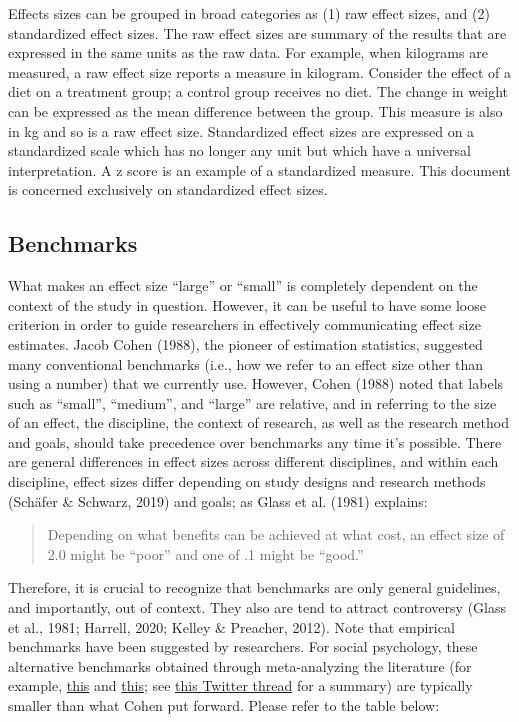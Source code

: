 \documentclass[
  man,
  colorlinks=true,linkcolor=blue,citecolor=blue,urlcolor=blue]{apa7}
\begin{document}
Effects sizes can be grouped in broad categories as (1) raw effect
sizes, and (2) standardized effect sizes. The raw effect sizes are
summary of the results that are expressed in the same units as the raw
data. For example, when kilograms are measured, a raw effect size
reports a measure in kilogram. Consider the effect of a diet on a
treatment group; a control group receives no diet. The change in weight
can be expressed as the mean difference between the group. This measure
is also in kg and so is a raw effect size. Standardized effect sizes are
expressed on a standardized scale which has no longer any unit but which
have a universal interpretation. A z score is an example of a
standardized measure. This document is concerned exclusively on
standardized effect sizes.

\hypertarget{benchmarks}{%
\subsection{Benchmarks}\label{benchmarks}}

What makes an effect size ``large'' or ``small'' is completely dependent
on the context of the study in question. However, it can be useful to
have some loose criterion in order to guide researchers in effectively
communicating effect size estimates. Jacob Cohen (1988), the pioneer of
estimation statistics, suggested many conventional benchmarks (i.e., how
we refer to an effect size other than using a number) that we currently
use. However, Cohen (1988) noted that labels such as ``small'',
``medium'', and ``large'' are relative, and in referring to the size of
an effect, the discipline, the context of research, as well as the
research method and goals, should take precedence over benchmarks any
time it's possible. There are general differences in effect sizes across
different disciplines, and within each discipline, effect sizes differ
depending on study designs and research methods (Schäfer \& Schwarz,
2019) and goals; as Glass et al. (1981) explains:

\begin{quote}
Depending on what benefits can be achieved at what cost, an effect size
of 2.0 might be ``poor'' and one of .1 might be ``good.''
\end{quote}

Therefore, it is crucial to recognize that benchmarks are only general
guidelines, and importantly, out of context. They also are tend to
attract controversy (Glass et al., 1981; Harrell, 2020; Kelley \&
Preacher, 2012). Note that empirical benchmarks have been suggested by
researchers. For social psychology, these alternative benchmarks
obtained through meta-analyzing the literature (for example,
\href{https://doi.org/10.1037/1089-2680.7.4.331}{this} and
\href{https://doi.org/10.1016/j.paid.2016.06.069}{this}; see
\href{https://twitter.com/cjsotomatic/status/1144701540839698432}{this
Twitter thread} for a summary) are typically smaller than what Cohen put
forward. Please refer to the table below:
\end{document}
